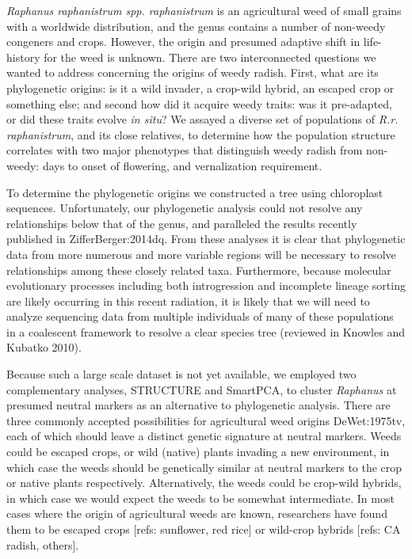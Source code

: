 \documentclass[twocolumn]{bmcart}%
\begin{document}
\textit{Raphanus raphanistrum spp. raphanistrum} is an agricultural weed of small grains with a worldwide distribution, and the genus contains a number of non-weedy congeners and crops. However, the origin and presumed adaptive shift in life-history for the weed is unknown. There are two interconnected questions we wanted to address concerning the origins of weedy radish. First, what are its phylogenetic origins: is it a wild invader, a crop-wild hybrid, an escaped crop or something else; and second how did it acquire weedy traits: was it pre-adapted, or did these traits evolve \textit{in situ}? We assayed a diverse set of populations of \textit{R.r. raphanistrum}, and its close relatives, to determine how the population structure correlates with two major phenotypes that distinguish weedy radish from non-weedy: days to onset of flowering, and vernalization requirement. 

To determine the phylogenetic origins we constructed a tree using chloroplast sequences. Unfortunately, our phylogenetic analysis could not resolve any relationships below that of the genus, and paralleled the results recently published in {ZifferBerger:2014dq}. From these analyses it is clear that phylogenetic data from more numerous and more variable regions will be necessary to resolve relationships among these closely related taxa. Furthermore, because molecular evolutionary processes including both introgression and incomplete lineage sorting are likely occurring in this recent radiation, it is likely that we will need to analyze sequencing data from multiple individuals of many of these populations in a coalescent framework to resolve a clear species tree (reviewed in Knowles and Kubatko 2010).

Because such a large scale dataset is not yet available, we employed two complementary analyses, STRUCTURE and SmartPCA, to cluster \textit{Raphanus} at presumed neutral markers as an alternative to phylogenetic analysis. There are three commonly accepted possibilities for agricultural weed origins {DeWet:1975tv}, each of which should leave a distinct genetic signature at neutral markers. Weeds could be escaped crops, or wild (native) plants invading a new environment, in which case the weeds should be genetically similar at neutral markers to the crop or native plants respectively. Alternatively, the weeds could be crop-wild hybrids, in which case we would expect the weeds to be somewhat intermediate. In most cases where the origin of agricultural weeds are known, researchers have found them to be escaped crops [refs: sunflower, red rice] or wild-crop hybrids [refs: CA radish, others].
\end{document}
